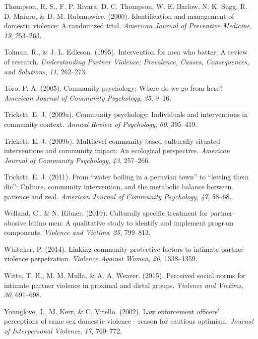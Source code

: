 \documentclass[11pt,]{tufte-book}
\begin{document}
\hypertarget{ref-thompson2000identification}{}
Thompson, R. S., F. P. Rivara, D. C. Thompson, W. E. Barlow, N. K. Sugg,
R. D. Maiuro, \& D. M. Rubanowice. (2000). Identification and management
of domestic violence: A randomized trial. \emph{American Journal of
Preventive Medicine}, \emph{19}, 253--263.

\hypertarget{ref-tolman1995intervention}{}
Tolman, R., \& J. L. Edleson. (1995). Intervention for men who batter: A
review of research. \emph{Understanding Partner Violence: Prevalence,
Causes, Consequences, and Solutions}, \emph{11}, 262--273.

\hypertarget{ref-toro2005community}{}
Toro, P. A. (2005). Community psychology: Where do we go from here?
\emph{American Journal of Community Psychology}, \emph{35}, 9--16.

\hypertarget{ref-trickett2009community}{}
Trickett, E. J. (2009a). Community psychology: Individuals and
interventions in community context. \emph{Annual Review of Psychology},
\emph{60}, 395--419.

\hypertarget{ref-trickett2009multilevel}{}
Trickett, E. J. (2009b). Multilevel community-based culturally situated
interventions and community impact: An ecological perspective.
\emph{American Journal of Community Psychology}, \emph{43}, 257--266.

\hypertarget{ref-trickett2011water}{}
Trickett, E. J. (2011). From ``water boiling in a peruvian town'' to
``letting them die'': Culture, community intervention, and the metabolic
balance between patience and zeal. \emph{American Journal of Community
Psychology}, \emph{47}, 58--68.

\hypertarget{ref-welland2010culturally}{}
Welland, C., \& N. Ribner. (2010). Culturally specific treatment for
partner-abusive latino men: A qualitative study to identify and
implement program components. \emph{Violence and Victims}, \emph{25},
799--813.

\hypertarget{ref-whitaker2014linking}{}
Whitaker, P. (2014). Linking community protective factors to intimate
partner violence perpetration. \emph{Violence Against Women}, \emph{20},
1338--1359.

\hypertarget{ref-witte2015perceived}{}
Witte, T. H., M. M. Mulla, \& A. A. Weaver. (2015). Perceived social
norms for intimate partner violence in proximal and distal groups.
\emph{Violence and Victims}, \emph{30}, 691--698.

\hypertarget{ref-younglove2002law}{}
Younglove, J., M. Kerr, \& C. Vitello. (2002). Law enforcement officers'
perceptions of same sex domestic violence - reason for cautious
optimism. \emph{Journal of Interpersonal Violence}, \emph{17}, 760--772.
\end{document}

